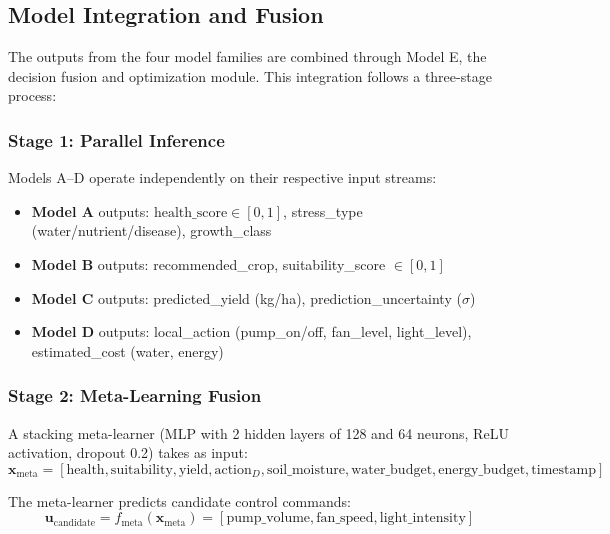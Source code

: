 \documentclass[conference]{IEEEtran}
\begin{document}
\subsection{Model Integration and Fusion}

The outputs from the four model families are combined through Model E, the decision fusion and optimization module. This integration follows a three-stage process:

\subsubsection{Stage 1: Parallel Inference}
Models A--D operate independently on their respective input streams:
\begin{itemize}
\item \textbf{Model A} outputs: $\text{health\_score} \in [0,1]$, stress\_type (water/nutrient/disease), growth\_class
\item \textbf{Model B} outputs: recommended\_crop, suitability\_score $\in [0,1]$
\item \textbf{Model C} outputs: predicted\_yield (kg/ha), prediction\_uncertainty ($\sigma$)
\item \textbf{Model D} outputs: local\_action (pump\_on/off, fan\_level, light\_level), estimated\_cost (water, energy)
\end{itemize}

\subsubsection{Stage 2: Meta-Learning Fusion}
A stacking meta-learner (MLP with 2 hidden layers of 128 and 64 neurons, ReLU activation, dropout 0.2) takes as input:
\begin{equation}
\mathbf{x}_{\text{meta}} = [\text{health}, \text{suitability}, \text{yield}, \text{action}_D, \text{soil\_moisture}, \text{water\_budget}, \text{energy\_budget}, \text{timestamp}]
\end{equation}

The meta-learner predicts candidate control commands:
\begin{equation}
\mathbf{u}_{\text{candidate}} = f_{\text{meta}}(\mathbf{x}_{\text{meta}}) = [\text{pump\_volume}, \text{fan\_speed}, \text{light\_intensity}]
\end{equation}
\end{document}
